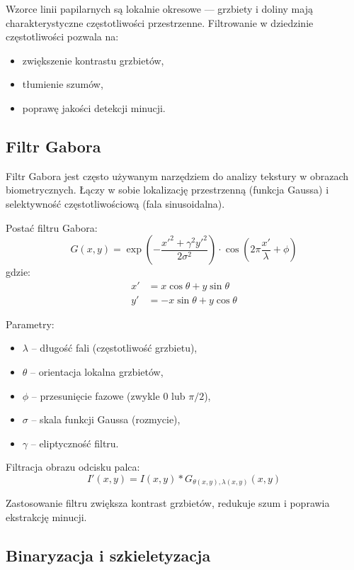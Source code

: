 Wzorce linii papilarnych są lokalnie okresowe — grzbiety i doliny mają charakterystyczne częstotliwości przestrzenne. Filtrowanie w dziedzinie częstotliwości pozwala na:
\begin{itemize}
	\item zwiększenie kontrastu grzbietów,
	\item tłumienie szumów,
	\item poprawę jakości detekcji minucji.
\end{itemize}

\subsection*{Filtr Gabora}

Filtr Gabora jest często używanym narzędziem do analizy tekstury w obrazach biometrycznych. Łączy w sobie lokalizację przestrzenną (funkcja Gaussa) i selektywność częstotliwościową (fala sinusoidalna).

Postać filtru Gabora:
\begin{equation}
	G(x, y) = \exp\left( -\frac{x'^2 + \gamma^2 y'^2}{2\sigma^2} \right) \cdot \cos\left(2\pi \frac{x'}{\lambda} + \phi \right)
\end{equation}
gdzie:
\begin{align}
	x' &= x \cos\theta + y \sin\theta \\
	y' &= -x \sin\theta + y \cos\theta
\end{align}

Parametry:
\begin{itemize}
	\item $\lambda$ – długość fali (częstotliwość grzbietu),
	\item $\theta$ – orientacja lokalna grzbietów,
	\item $\phi$ – przesunięcie fazowe (zwykle 0 lub $\pi/2$),
	\item $\sigma$ – skala funkcji Gaussa (rozmycie),
	\item $\gamma$ – eliptyczność filtru.
\end{itemize}

Filtracja obrazu odcisku palca:
\begin{equation}
	I'(x, y) = I(x, y) * G_{\theta(x,y), \lambda(x,y)}(x, y)
\end{equation}

Zastosowanie filtru zwiększa kontrast grzbietów, redukuje szum i poprawia ekstrakcję minucji.

\subsection*{Binaryzacja i szkieletyzacja}

